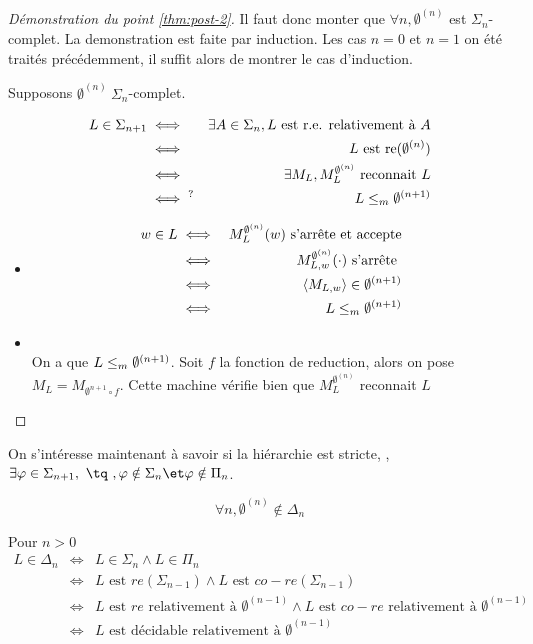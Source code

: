 \begin{proof}[Démonstration du point \ref{thm:post-2}]
	Il faut donc monter que $\forall n, \emptyset^{(n)}$ est $\Sigma_n$-complet.
	La demonstration est faite par induction. Les cas $n =0$ et $n=1$ on été traités précédemment, il suffit alors de montrer le cas d'induction.

	Supposons $\emptyset^{(n)} \ \Sigma_n$-complet.

	\begin{eqnarray*}
		L \in \Sigma_{n+1} &\iff& \exists A \in \Sigma_n, L \text { est r.e. relativement à } A \\
		&\iff& L \text{ est re}(\emptyset^{(n)})\\
		&\iff& \exists M_L, M_L^{\emptyset^{(n)}} \text { reconnait } L \\
		&\iff^? & L \leq_m \emptyset^{(n + 1)}
	\end{eqnarray*}

	\begin{itemize}
		\item \bimpLR
		      \begin{eqnarray*}
			      w \in  L  &\iff&  M_L^{\emptyset^{(n)}}(w) \text{ s'arrête et accepte} \\
			      &\iff&  M_{L,w}^{\emptyset^{(n)}}(\cdot) \text{ s'arrête } \\
			      &\iff&  \left\langle M_{L,w}\right\rangle \in \emptyset^{(n+1)} \\
			      &\iff&  L \leq_m  \emptyset^{(n+1)}
		      \end{eqnarray*}
		\item \bimpRL \\
		      On a que $L \leq_m \emptyset^{(n+1)}$. Soit $f$ la fonction de reduction, alors on pose
		      $M_L = M_{\emptyset^{n+1} \circ f}$. Cette machine vérifie bien que $M_L^{\emptyset^{(n)}}$ reconnait  $L$
	\end{itemize}
\end{proof}



On s'intéresse maintenant à savoir si la hiérarchie est stricte, \ie, $\exists \phi \in \Sigma_{n+1}, \text{ \tq }, \phi \notin \Sigma_n \et \phi \notin \Pi_n$.


\begin{prop}
	$$\forall n, \emptyset^{(n)} \notin \Delta_n$$
\end{prop}


\begin{remarque}
	Pour $n > 0$
	\begin{eqnarray*}
		L \in \Delta_n &\iff& L \in \Sigma_n \land L \in \Pi_n \\
		&\iff& L \text{ est } re(\Sigma_{n-1}) \land L \text{ est } co-re(\Sigma_{n-1})\\
		&\iff& L \text{ est } re \text{ relativement à } \emptyset^{(n-1)} \land  L \text{ est } co-re \text{ relativement à } \emptyset^{(n-1)} \\
		&\iff& L \text{ est décidable relativement à } \emptyset^{(n-1)}
	\end{eqnarray*}
\end{remarque}

